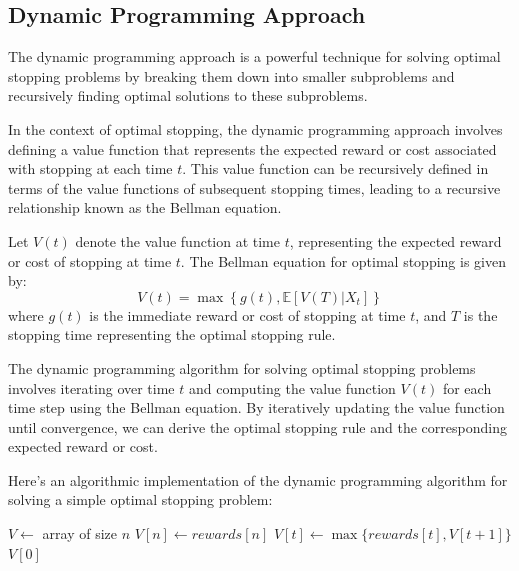 \documentclass[12pt]{book} %
\begin{document}
\subsection{Dynamic Programming Approach}

The dynamic programming approach is a powerful technique for solving optimal stopping problems by breaking them down into smaller subproblems and recursively finding optimal solutions to these subproblems.

In the context of optimal stopping, the dynamic programming approach involves defining a value function that represents the expected reward or cost associated with stopping at each time \( t \). This value function can be recursively defined in terms of the value functions of subsequent stopping times, leading to a recursive relationship known as the Bellman equation.

Let \( V(t) \) denote the value function at time \( t \), representing the expected reward or cost of stopping at time \( t \). The Bellman equation for optimal stopping is given by:
\[
V(t) = \max \left\{ g(t), \mathbb{E}[V(T) | X_t] \right\}
\]
where \( g(t) \) is the immediate reward or cost of stopping at time \( t \), and \( T \) is the stopping time representing the optimal stopping rule.

The dynamic programming algorithm for solving optimal stopping problems involves iterating over time \( t \) and computing the value function \( V(t) \) for each time step using the Bellman equation. By iteratively updating the value function until convergence, we can derive the optimal stopping rule and the corresponding expected reward or cost.

Here's an algorithmic implementation of the dynamic programming algorithm for solving a simple optimal stopping problem:
\FloatBarrier
\begin{algorithm}
\caption{Dynamic Programming Algorithm for Optimal Stopping}
\begin{algorithmic}[1]
    \State $V \gets$ array of size $n$ 
    \State $V[n] \gets rewards[n]$ 
     
        \State $V[t] \gets \max \{rewards[t], V[t+1]\}$ 
    \EndFor
    \State \Return $V[0]$ 
\EndFunction
\end{algorithmic}
\end{algorithm}
\FloatBarrier
\end{document}
